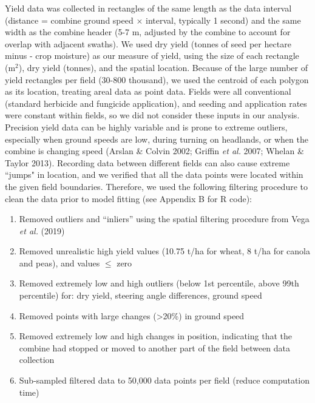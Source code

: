 \documentclass[]{elsarticle} %
\providecommand{\tightlist}{%
  \setlength{\itemsep}{0pt}\setlength{\parskip}{0pt}}
\begin{document}
Yield data was collected in rectangles of the same length as the data interval (distance = combine ground speed \(\times\) interval, typically 1 second) and the same width as the combine header (5-7 m, adjusted by the combine to account for overlap with adjacent swaths).
We used dry yield (tonnes of seed per hectare minus - crop moisture) as our measure of yield, using the size of each rectangle (m\(^2\)), dry yield (tonnes), and the spatial location.
Because of the large number of yield rectangles per field (30-800 thousand), we used the centroid of each polygon as its location, treating areal data as point data.
Fields were all conventional (standard herbicide and fungicide application), and seeding and application rates were constant within fields, so we did not consider these inputs in our analysis.
Precision yield data can be highly variable and is prone to extreme outliers, especially when ground speeds are low, during turning on headlands, or when the combine is changing speed (Arslan \& Colvin 2002; Griffin \emph{et al.} 2007; Whelan \& Taylor 2013).
Recording data between different fields can also cause extreme ``jumps" in location, and we verified that all the data points were located within the given field boundaries.
Therefore, we used the following filtering procedure to clean the data prior to model fitting (see Appendix B for R code):

\begin{enumerate}
\def\labelenumi{\arabic{enumi}.}
\tightlist
\item Removed outliers and ``inliers'' using the spatial filtering procedure from Vega \emph{et al.} (2019)
\item Removed unrealistic high yield values (10.75 t/ha for wheat, 8 t/ha for canola and peas), and values $\leq$ zero 
\item Removed extremely low and high outliers (below 1st percentile, above 99th percentile) for: dry yield, steering angle differences, ground speed
\item Removed points with large changes (\textgreater20\%) in ground speed
\item Removed extremely low and high changes in position, indicating that the combine had stopped or moved to another part of the field between data collection
\item Sub-sampled filtered data to 50,000 data points per field (reduce computation time)
\end{enumerate}
\end{document}
